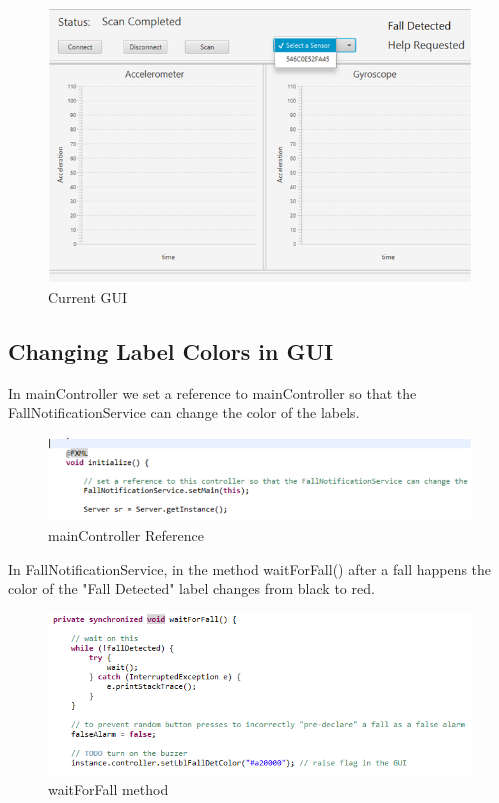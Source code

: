 \documentclass[12pt]{article}
\begin{document}
\FloatBarrier
\begin{figure}[h]
	\centering
	\includegraphics[scale=0.80]{images/UI_4.png}
	\caption{Current GUI}
	\label{img:UI_4}
\end{figure}
\FloatBarrier

\subsection{Changing Label Colors in GUI}
In mainController we set a reference to mainController so that the FallNotificationService can change the color of the labels.
\FloatBarrier
\begin{figure}[h]
	\centering
	\includegraphics[scale=0.80]{images/UI_1.png}
	\caption{mainController Reference}
	\label{img:UI_1}
\end{figure}
\FloatBarrier
\clearpage
In FallNotificationService, in the method waitForFall() after a fall happens the color of the "Fall Detected" label changes from black to red.
\FloatBarrier
\begin{figure}[h]
	\centering
	\includegraphics[scale=0.80]{images/UI_2.png}
	\caption{waitForFall method}
	\label{img:UI_2}
\end{figure}
\FloatBarrier
\end{document}
